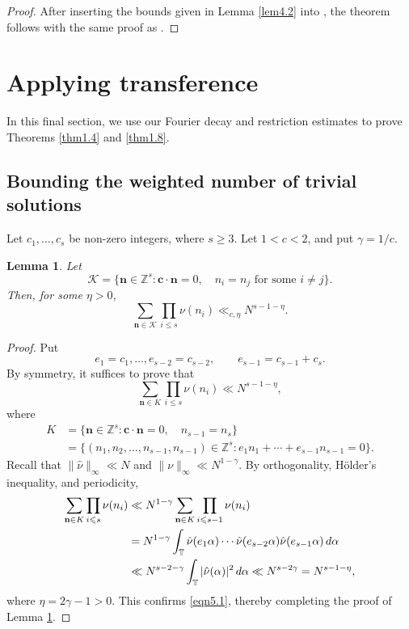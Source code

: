 \documentclass[12pt, reqno]{amsart}
\newtheorem{lemma}[thm]{Lemma}
\theoremstyle{definition}
\theoremstyle{remark}
\numberwithin{equation}{section}
\theoremstyle{definition}
\def\alp{{\alpha}} \def\bfalp{{\boldsymbol \alpha}}
\def\gam{{\gamma}} \def\Gam{{\Gamma}}
\def\le{\leqslant} \def\ge{\geqslant} \def\pleq{\preccurlyeq} \def\ple{\prec}
\def\d{{\,{\rm d}}}
\def \bZ {\mathbb Z}
\def \bT {\mathbb T}
\def \bc {\mathbf c}
\def \bn {{\mathbf{n}}}
\def \cK {\mathcal K}
\begin{document}
\begin{proof}
After inserting the bounds given in Lemma \ref{lem4.2} into \cite[Equations (2.4) and (2.5)]{BP2017}, the theorem follows with the same proof as \cite[Proposition 2.8]{BP2017}.
\end{proof}

\section{Applying transference}
\label{sec5}

In this final section, we use our Fourier decay and restriction estimates to prove Theorems \ref{thm1.4} and \ref{thm1.8}.

\subsection{Bounding the weighted number of trivial solutions}

Let $c_1, \ldots, c_s$ be non-zero integers, where $s \ge 3$.  Let $1 < c < 2$, and put $\gam = 1/c$.

\begin{lemma} 
\label{lem5.1}
Let
\[
\cK = \{ \bn \in \bZ^s: \bc \cdot \bn = 0, \quad
n_i = n_j \text{ for some } i \ne j \}.
\]
Then, for some $\eta > 0$,
\[
\sum_{\bn \in \cK} \prod_{i\le s} \nu(n_i) \ll_{c,\eta} N^{s - 1 - \eta}.
\]
\end{lemma}

\begin{proof} Put
\[
e_1 = c_1, \ldots, e_{s-2} = c_{s-2}, \qquad
e_{s-1} = c_{s-1} + c_s.
\]
By symmetry, it suffices to prove that
\begin{equation}
\label{eqn5.1}
\sum_{\bn \in K} \prod_{i \le s} \nu(n_i) \ll N^{s-1-\eta},
\end{equation}
where
\begin{align*}
K &= \{ \bn \in \bZ^s: \bc \cdot \bn = 0, \quad
n_{s-1} = n_s \} \\
&= \{ (n_1, n_2, \ldots, n_{s-1}, n_{s-1}) \in \bZ^s:
e_1 n_1 + \cdots + e_{s-1} n_{s-1} = 0 \}.
\end{align*}
Recall that $\| \hat \nu \|_\infty \ll N$ and $\| \nu \|_\infty \ll N^{1-\gam}$. By orthogonality,  H\"older's inequality, and periodicity,
\begin{align*}
\sum_{\bn \in K} \prod_{i \le s} \nu(n_i) &\ll N^{1-\gam}
\sum_{\bn \in K} \prod_{i \le s - 1} \nu(n_i) \\
&= N^{1-\gam}
\int_\bT \hat \nu(e_1 \alp) \cdots \hat \nu(e_{s-2}\alp) \hat \nu (e_{s-1} \alp) \d \alp \\
&\ll N^{s-2-\gam} \int_\bT |\hat 
\nu(\alp)|^2 \d \alp \ll N^{s - 2 \gam} = N^{s - 1 - \eta},
\end{align*}
where $\eta = 2\gam - 1 > 0$. This confirms \eqref{eqn5.1}, thereby completing the proof of Lemma \ref{lem5.1}.
\end{proof}
\end{document}
